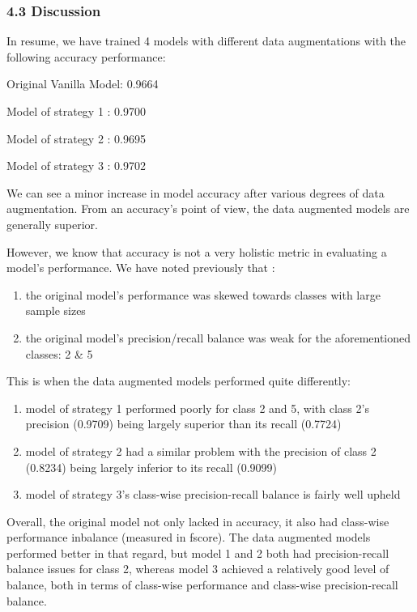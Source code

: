 \documentclass[11pt]{article}
\providecommand{\tightlist}{%
      \setlength{\itemsep}{0pt}\setlength{\parskip}{0pt}}
\begin{document}
    \subsubsection{4.3 Discussion}\label{discussion}

    In resume, we have trained 4 models with different data augmentations
with the following accuracy performance:

Original Vanilla Model: 0.9664

Model of strategy 1 : 0.9700

Model of strategy 2 : 0.9695

Model of strategy 3 : 0.9702

We can see a minor increase in model accuracy after various degrees of
data augmentation. From an accuracy's point of view, the data augmented
models are generally superior.

However, we know that accuracy is not a very holistic metric in
evaluating a model's performance. We have noted previously that :

\begin{enumerate}
\def\labelenumi{\arabic{enumi}.}
\tightlist
\item
  the original model's performance was skewed towards classes with large
  sample sizes
\item
  the original model's precision/recall balance was weak for the
  aforementioned classes: 2 \& 5
\end{enumerate}

This is when the data augmented models performed quite differently:

\begin{enumerate}
\def\labelenumi{\arabic{enumi}.}
\tightlist
\item
  model of strategy 1 performed poorly for class 2 and 5, with class 2's
  precision (0.9709) being largely superior than its recall (0.7724)
\item
  model of strategy 2 had a similar problem with the precision of class
  2 (0.8234) being largely inferior to its recall (0.9099)
\item
  model of strategy 3's class-wise precision-recall balance is fairly
  well upheld
\end{enumerate}

Overall, the original model not only lacked in accuracy, it also had
class-wise performance inbalance (measured in fscore). The data
augmented models performed better in that regard, but model 1 and 2 both
had precision-recall balance issues for class 2, whereas model 3
achieved a relatively good level of balance, both in terms of class-wise
performance and class-wise precision-recall balance.
\end{document}

